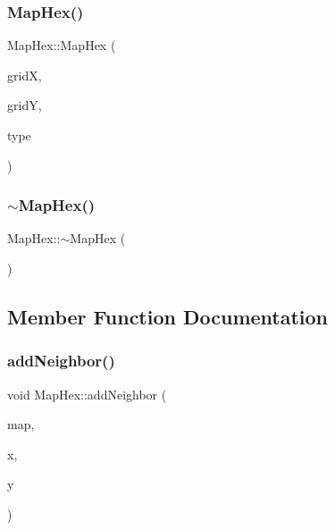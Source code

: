 \mbox{\label{class_map_hex_afdb8d14d89ae9bdd45f74b063ec55f1f}} 
\subsubsection{\texorpdfstring{Map\+Hex()}{MapHex()}\hspace{0.1cm}{\footnotesize\ttfamily [2/2]}}
{\footnotesize\ttfamily Map\+Hex\+::\+Map\+Hex (\begin{DoxyParamCaption}\item[{uint16\+\_\+t}]{gridX,  }\item[{uint16\+\_\+t}]{gridY,  }\item[{\hyperlink{class_hex_type}{Hex\+Type} $\ast$}]{type }\end{DoxyParamCaption})}

\mbox{\label{class_map_hex_a95541178e4dabb2cafe2f2e12579815b}} 
\subsubsection{\texorpdfstring{$\sim$\+Map\+Hex()}{~MapHex()}}
{\footnotesize\ttfamily Map\+Hex\+::$\sim$\+Map\+Hex (\begin{DoxyParamCaption}{ }\end{DoxyParamCaption})\hspace{0.3cm}{\ttfamily [virtual]}}



\subsection{Member Function Documentation}
\mbox{\label{class_map_hex_ab48b0a671613382e07a58917e8634797}} 
\subsubsection{\texorpdfstring{add\+Neighbor()}{addNeighbor()}}
{\footnotesize\ttfamily void Map\+Hex\+::add\+Neighbor (\begin{DoxyParamCaption}\item[{\hyperlink{class_game_map}{Game\+Map} $\ast$}]{map,  }\item[{int}]{x,  }\item[{int}]{y }\end{DoxyParamCaption})\hspace{0.3cm}{\ttfamily [private]}}

